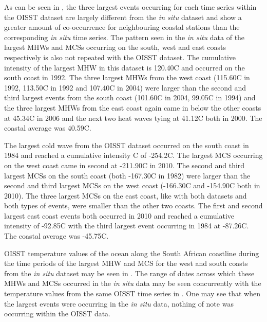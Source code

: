 \documentclass[a4paper,10pt,review]{elsarticle}
\begin{document}
As can be seen in , the three largest events occurring for each time series within the OISST dataset are largely different from the \emph{in situ} dataset and show a greater amount of co-occurrence for neighbouring coastal stations than the corresponding \emph{in situ} time series. The pattern seen in the \emph{in situ} data of the largest MHWs and MCSs occurring on the south, west and east coasts respectively is also not repeated with the OISST dataset. The cumulative intensity of the largest MHW in this dataset is 120.40\degree C and occurred on the south coast in 1992. The three largest MHWs from the west coast (115.60\degree C in 1992, 113.50\degree C in 1992 and 107.40\degree C in 2004) were larger than the second and third largest events from the south coast (101.60\degree C in 2004, 99.05\degree C in 1994) and the three largest MHWs from the east coast again came in below the other coasts at 45.34\degree C in 2006 and the next two heat waves tying at 41.12\degree C both in 2000. The coastal average was 40.59\degree C.

The largest cold wave from the OISST dataset occurred on the south coast in 1984 and reached a cumulative intensity \degree C of -254.2\degree C. The largest MCS occurring on the west coast came in second at -211.90\degree C in 2010. The second and third largest MCSs on the south coast (both -167.30\degree C in 1982) were larger than the second and third largest MCSs on the west coast (-166.30\degree C and -154.90\degree C both in 2010). The three largest MCSs on the east coast, like with both datasets and both types of events, were smaller than the other two coasts. The first and second largest east coast events both occurred in 2010 and reached a cumulative intensity of -92.85\degree C with the third largest event occurring in 1984 at -87.26\degree C. The coastal average was -45.75\degree C.

OISST temperature values of the ocean along the South African coastline during the time periods of the largest MHW and MCS for the west and south coasts from the \emph{in situ} dataset may be seen in . The range of dates across which these MHWs and MCSs occurred in the \emph{in situ} data may be seen concurrently with the temperature values from the same OISST time series in . One may see that when the largest events were occurring in the \emph{in situ} data, nothing of note was occurring within the OISST data.

\end{document}
